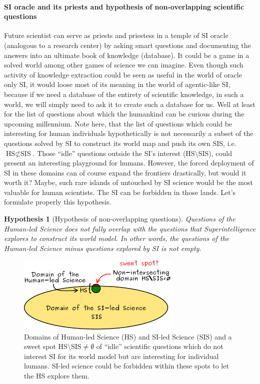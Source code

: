\documentclass[a4paper,11pt]{article}
\newtheorem{hypothesis}{Hypothesis}
\begin{document}
\paragraph{SI oracle and its priests and hypothesis of non-overlapping scientific questions\label{sec:oracle}}
Future scientist can serve as priests and priestess in a temple of SI oracle (analogous to a research center) by asking smart questions and documenting the answers into an ultimate book of knowledge (database). It could be a game in a solved world among other games of science we can imagine. Even though such activity of knowledge extraction could be seen as useful in the world of oracle only SI, it would loose most of its meaning in the world of agentic-like SI, because if we need a database of the entirety of scientific knowledge, in such a world, we will simply need to ask it to create such a database for us. Well at least for the list of questions about which the humankind can be curious during the upcoming millennium. Note here, that the list of questions which could be interesting for human individuals hypothetically is not necessarily a subset of the questions solved by SI to construct its world map and push its own SIS, i.e. $\text{HS} \not\subset \text{SIS}$. Those ``idle'' questions outside the SI's interest ($\text{HS} \setminus \text{SIS}$), could present an interesting playground for humans. However, the forced deployment of SI in these domains can of course expand the frontiers drastically, but would it worth it? Maybe, such rare islands of untouched by SI science would be the most valuable for human scientists. The SI can be forbidden in those lands.
Let's formulate properly this hypothesis.

\begin{hypothesis}[Hypothesis of non-overlapping questions]\label{hyp:SI}
Questions of the Human-led Science does not fully overlap with the questions that Superintelligence explores to construct its world model. In other words, the questions of the Human-led Science minus questions explored by SI is not empty.
\end{hypothesis}



\begin{figure}[h!]
    \centering\includegraphics[width=0.7\textwidth]{intersections}
    \caption{\label{fig:intersection}Domains of Human-led Science (HS) and SI-led Science (SIS) and a sweet spot $\text{HS} \setminus \text{SIS} \ne \emptyset$ of ``idle'' scientific questions which do not interest SI for its world model but are interesting for individual humans. SI-led science could be forbidden within these spots to let the HS explore them.}
\end{figure}
\end{document}
